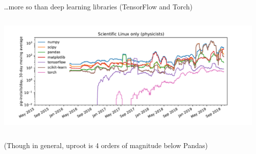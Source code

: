 \documentclass[aspectratio=169]{beamer}
\begin{document}
\begin{frame}{\ldots more so than deep learning libraries (TensorFlow and Torch)}
\vspace{0.5 cm}
\begin{columns}
\includegraphics[width=\linewidth]{pip-scilinux-ml.pdf}
\end{columns}
\end{frame}

\begin{frame}{(Though in general, uproot is 4 orders of magnitude below Pandas)}
\vspace{0.5 cm}
\begin{columns}
\end{columns}
\end{frame}
\end{document}

